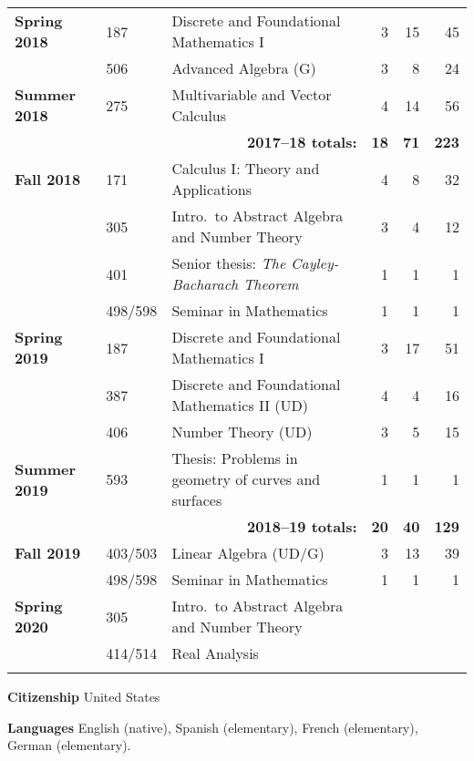 \documentclass[12pt]{article}
\begin{document}
\begin{center}
\begin{longtable}{@{} l l l rrr @{}}
\textbf{Spring 2018} & 187 & Discrete and Foundational Mathematics I & 3 & 15 & 45 \\
 & 506 & Advanced Algebra (G) & 3 & 8 & 24 \\
\addlinespace[0.1in]

\textbf{Summer 2018} & 275 & Multivariable and Vector Calculus & 4 & 14 & 56 \\

 \cmidrule{3-6}
 & & \multicolumn{1}{r}{\textbf{2017--18 totals:}} & \textbf{18} & \textbf{71} & \textbf{223} \\
 \cmidrule{3-6}

\textbf{Fall 2018} & 171 & Calculus I: Theory and Applications & 4 & 8 & 32 \\
 & 305 & Intro.\ to Abstract Algebra and Number Theory & 3 & 4 & 12 \\
 & 401 & Senior thesis: \emph{The Cayley-Bacharach Theorem} & 1 & 1 & 1 \\
 & 498/598 & Seminar in Mathematics & 1 & 1 & 1 \\
\addlinespace[0.1in]

\textbf{Spring 2019} & 187 & Discrete and Foundational Mathematics I & 3 & 17 & 51 \\
 & 387 & Discrete and Foundational Mathematics II (UD) & 4 & 4 & 16 \\
 & 406 & Number Theory (UD) & 3 & 5 & 15 \\
\addlinespace[0.1in]

\textbf{Summer 2019} & 593 & Thesis: Problems in geometry of curves and surfaces & 1 & 1 & 1 \\

 \cmidrule{3-6}
 & & \multicolumn{1}{r}{\textbf{2018--19 totals:}} & \textbf{20} & \textbf{40} & \textbf{129} \\
 \cmidrule{3-6}


\textbf{Fall 2019} & 403/503 & Linear Algebra (UD/G) & 3 & 13 & 39 \\
 & 498/598 & Seminar in Mathematics & 1 & 1 & 1 \\
\addlinespace[0.1in]

\textbf{Spring 2020} & 305 & Intro.\ to Abstract Algebra and Number Theory \\
 & 414/514 & Real Analysis \\
\addlinespace[0.1in]

\bottomrule


\end{longtable}
\end{center}




\textbf{Citizenship}
\quad United States
\bigskip


\textbf{Languages}
\quad English (native), Spanish (elementary), French (elementary), German (elementary).
\bigskip
\end{document}
